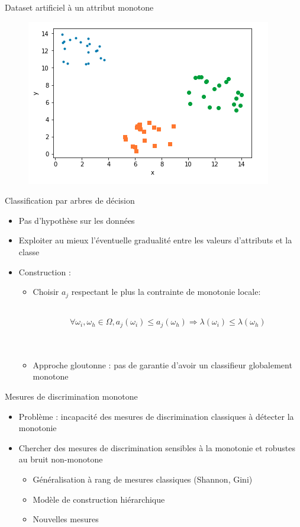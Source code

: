 \documentclass[usenames,dvipsnames]{beamer}
\begin{document}
\begin{frame}{Dataset artificiel à un attribut monotone}

\begin{figure}
	\includegraphics[width=.7\textwidth]{artificial-dataset.png}
\end{figure}

\end{frame}

\begin{frame}{Classification par arbres de décision}
\begin{itemize}
\item Pas d'hypothèse sur les données
\item Exploiter au mieux l'éventuelle gradualité entre les valeurs d'attributs et la classe
\item Construction :
\begin{itemize}
\item Choisir $a_j$ respectant le plus la contrainte de monotonie locale: \\~\

$$\forall \omega_i, \omega_h \in \Omega, a_j(\omega_i) \leq a_j(\omega_h) \Rightarrow \lambda(\omega_i) \leq \lambda(\omega_h)$$ \\~\

\item Approche gloutonne : pas de garantie d'avoir un classifieur globalement monotone

\end{itemize}
\end{itemize}

\end{frame}

\begin{frame}{Mesures de discrimination monotone}
    \begin{itemize}
    \item Problème : incapacité des mesures de discrimination classiques à détecter la monotonie 
    \item Chercher des mesures de discrimination sensibles à la monotonie et robustes au bruit non-monotone
    \begin{itemize}
        \item Généralisation à rang de mesures classiques (Shannon, Gini)
        \item Modèle de construction hiérarchique
        \item Nouvelles mesures
    \end{itemize}
\end{itemize}
\end{frame}
\end{document}
